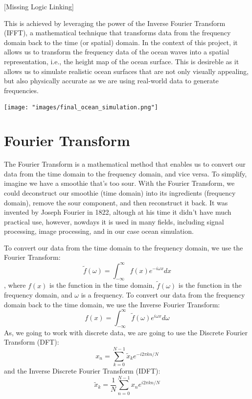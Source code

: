 [Missing Logic Linking]

This is achieved by leveraging the power of the Inverse Fourier Transform (IFFT), a mathematical technique that transforms data 
from the frequency domain back to the time (or spatial) domain. In the context of this project, 
it allows us to transform the frequency data of the ocean waves into a spatial representation, i.e., the height map of the ocean surface. This is
desireble as it allows us to simulate realistic ocean surfaces that are not only visually appealing, but also physically accurate as 
we are using real-world data to generate frequencies.

\begin{minipage}{1\textwidth}
    \centering
    \texttt{[image: "images/final\_ocean\_simulation.png"]}
    \label{fig:ocean_simulation}
\end{minipage}

\section{Fourier Transform}
The Fourier Transform is a mathematical method that enables us to convert our data from the time domain to the frequency domain, and vice versa. To simplify, imagine we have a smoothie that’s too sour. With the Fourier Transform, we could deconstruct our smoothie (time domain) into its ingredients (frequency domain), remove the sour component, and then reconstruct it back.
It was invented by Joseph Fourier\cite{fourier1822} in 1822, altough at his time it didn't have much practical use, however, nowdays it is used in many fields, including signal processing, image processing, and in our case ocean simulation.

To convert our data from the time domain to the frequency domain, we use the Fourier Transform:
\begin{equation}
\tilde{f}(\omega) = \int_{-\infty}^{\infty} f(x) e^{-i \omega x} dx
\end{equation}
, where $f(x)$ is the function in the time domain, $\tilde{f}(\omega)$ is the function in the frequency domain, and $\omega$ is a frequency.
To convert our data from the frequency domain back to the time domain, we use the Inverse Fourier Transform:
\begin{equation}
f(x) = \int_{-\infty}^{\infty} \tilde{f}(\omega) e^{i \omega x} d\omega
\end{equation}
As, we going to work with discrete data, we are going to use the Discrete Fourier Transform (DFT):
\begin{equation}
    x_n = \sum_{k=0}^{N-1} \tilde{x}_k e^{-i 2 \pi k n / N}
\end{equation}
and the Inverse Discrete Fourier Transform (IDFT):
\begin{equation}
    \tilde{x}_k = \frac{1}{N} \sum_{n=0}^{N-1} x_n e^{i 2 \pi k n / N}
    \label{eq:idft}
\end{equation}

